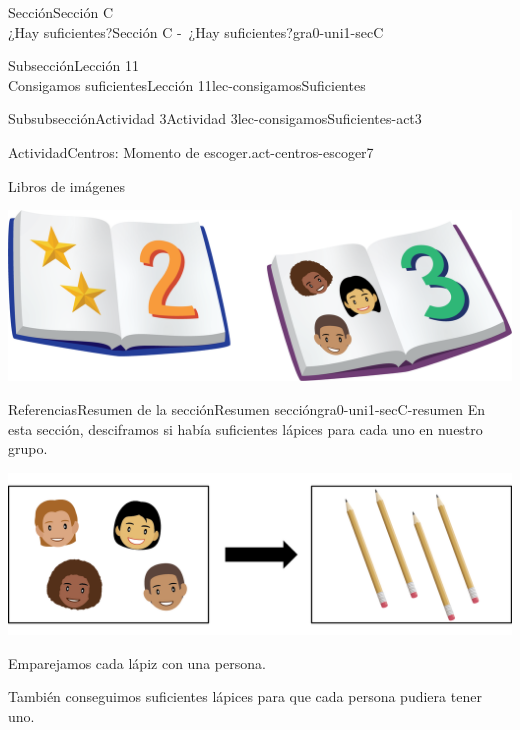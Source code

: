 \begin{sectionptx}{Sección}{{\Large Sección C\\}¿Hay suficientes?}{}{Sección C -~¿Hay suficientes?}{}{}{gra0-uni1-secC}
\begin{subsectionptx}{Subsección}{{\normalsize Lección 11\\[-0.05cm]}Consigamos suficientes}{}{Lección 11}{}{}{lec-consigamosSuficientes}
\begin{subsubsectionptx}{Subsubsección}{Actividad 3}{}{Actividad 3}{}{}{lec-consigamosSuficientes-act3}
\begin{activity}{Actividad}{Centros: Momento de escoger.}{act-centros-escoger7}
\begin{sidebyside}{2}{0.025}{0.025}{0.05}
\begin{sbspanel}{0.45}
\end{sbspanel}%
\begin{sbspanel}{0.45}%
Libros de imágenes%
\par
\includegraphics[max width=\linewidth, center]{external/png-source/K.1.D Beta Student Workbooks.Books.png}
\end{sbspanel}%
\end{sidebyside}%
\end{activity}%
\end{subsubsectionptx}
\end{subsectionptx}
%
%
\typeout{************************************************}
\typeout{************************************************}
%
\begin{references-subsection}{Referencias}{Resumen de la sección}{}{Resumen sección}{}{}{gra0-uni1-secC-resumen}
En esta sección, desciframos si había suficientes lápices para cada uno en nuestro grupo.%
\begin{image}{0}{1}{0}{}%
\includegraphics[max width=\linewidth, center]{external/png-source/K.1.C Beta Student Workbook.4Kids4Pencils.png}
\end{image}%
Emparejamos cada lápiz con una persona.%
\par
También conseguimos suficientes lápices para que cada persona pudiera tener uno.%
\end{references-subsection}
\end{sectionptx}
%
%
\typeout{************************************************}
\typeout{************************************************}
